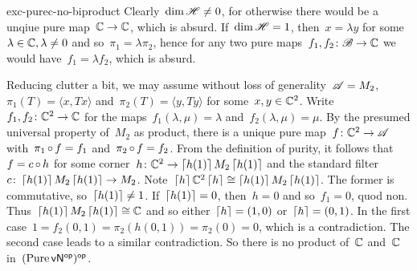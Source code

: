 \begin{solution}{exc-purec-no-biproduct}
Clearly~$\dim \mathscr{H} \neq 0$, for otherwise there would be a unqiue pure map~$\mathbb{C} \to \mathbb{C}$, which is absurd.
If~$\dim \mathscr{H} = 1$, then~$x = \lambda y$ for some~$\lambda \in \mathbb{C}, \lambda \neq 0$
    and so~$\pi_1 = \lambda \pi_2$,
    hence for any two pure maps~$f_1,f_2\colon \mathscr{B} \to \mathbb{C}$ we would have~$f_1 = \lambda f_2$,
        which is absurd.

Reducing clutter a bit,
    we may assume without loss of generality~$\mathscr{A} = M_2$, $\pi_1(T) = \langle x, Tx\rangle$
    and~$\pi_2(T) = \langle y, T y\rangle$ for some~$x,y \in \mathbb{C}^2$.
Write~$f_1,f_2\colon \mathbb{C}^2\to\mathbb{C}$
    for the maps~$f_1(\lambda,\mu) = \lambda$
    and~$f_2(\lambda,\mu) = \mu$.
By the presumed universal property of~$M_2$ as product,
    there is a unique pure map~$f\colon \mathbb{C}^2 \to \mathscr{A}$
    with~$\pi_1 \mathop{\circ} f = f_1$ and~$\pi_2 \mathop{\circ} f = f_2$.
From the definition of purity,
    it follows that~$f = c \mathop{\circ} h$
        for some corner~$h\colon \mathbb{C}^2 \to \left\lceil h(1)\right\rceil M_2 \left\lceil h(1)\right\rceil$
        and the standard filter~$c \colon \left\lceil h(1)\right\rceil M_2 \left\lceil h(1)\right\rceil \to M_2$.
Note~$\left\lceil h\right\rceil \mathbb{C}^2 \left\lceil h\right\rceil \cong \left\lceil h(1)\right\rceil M_2 \left\lceil h(1)\right\rceil$.
The former is commutative, so~$\left\lceil h(1)\right\rceil \neq 1$.
If~$\left\lceil h(1)\right\rceil = 0$, then~$h = 0$ and so~$f_1=0$, quod non.
Thus~$\left\lceil h(1)\right\rceil M_2 \left\lceil h(1)\right\rceil \cong \mathbb{C}$ and so
    either~$\left\lceil h\right\rceil = (1,0)$
    or~$\left\lceil h\right\rceil = (0,1)$.
In the first case~$1 = f_2 (0,1)= \pi_2 (h(0,1)) = \pi_2(0) = 0$,
    which is a contradiction.
The second case leads to a similar contradiction.
So there is no product of~$\mathbb{C}$ and~$\mathbb{C}$ in~$(\operatorname{Pure} {\mathsf{vN}}{^{\mathsf{op}}})^{\mathsf{op}}$.
\end{solution}

